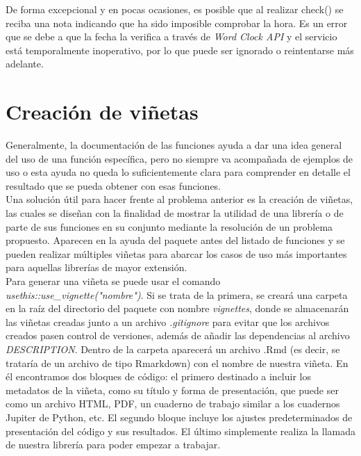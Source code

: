 De forma excepcional y en pocas ocasiones, es posible que al realizar check() se reciba una nota indicando que ha sido imposible comprobar la hora. Es un error que se debe a que la fecha la verifica a través de \textit{Word Clock API} \cite{worldclock} y el servicio está temporalmente inoperativo, por lo que puede ser ignorado o reintentarse más adelante.\\

\section{Creación de viñetas} \label{sect:3.4}
Generalmente, la documentación de las funciones  ayuda a dar una idea general del uso de una función específica, pero no siempre va acompañada de ejemplos de uso o esta ayuda no queda lo suficientemente clara para comprender en detalle el resultado que se pueda obtener con esas funciones. \\

Una solución útil para hacer frente al problema anterior es la creación de viñetas, las cuales se diseñan con la finalidad de mostrar la utilidad de una librería o de parte de sus funciones en su conjunto mediante la resolución de un problema propuesto. Aparecen en la ayuda del paquete antes del listado de funciones y se pueden realizar múltiples viñetas para abarcar los casos de uso más importantes para aquellas librerías de mayor extensión.\\

Para generar una viñeta se puede usar el comando \textit{usethis::use\_vignette("nombre")}. Si se trata de la primera, se creará una carpeta en la raíz del directorio del paquete con nombre \textit{vignettes}, donde se almacenarán las viñetas creadas junto a un archivo \textit{.gitignore} para evitar que los archivos creados pasen control de versiones, además de añadir las dependencias al archivo \textit{DESCRIPTION}. Dentro de la carpeta aparecerá un archivo .Rmd (es decir, se trataría de un archivo de tipo Rmarkdown) con el nombre de nuestra viñeta. En él encontramos dos bloques de código: el primero destinado a incluir los metadatos de la viñeta, como su título y forma de presentación, que puede ser como un archivo HTML, PDF, un cuaderno de trabajo similar a los cuadernos Jupiter de Python, etc. El segundo bloque incluye los ajustes predeterminados de presentación del código y sus resultados. El último simplemente realiza la llamada de nuestra librería para poder empezar a trabajar.\\



